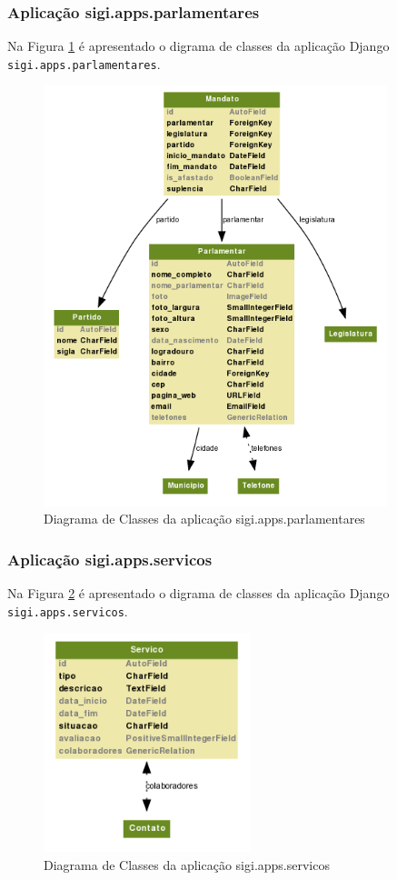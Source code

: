 \subsubsection{Aplicação sigi.apps.parlamentares}
Na Figura \ref{fig:parlamentares} é apresentado o digrama de classes da
aplicação Django \verb|sigi.apps.parlamentares|.

\begin{figure}[h]
  \centering
  \includegraphics[width=100mm]{../imagens/parlamentares.png}
  \caption{Diagrama de Classes da aplicação sigi.apps.parlamentares}
  \label{fig:parlamentares}
\end{figure}

\subsubsection{Aplicação sigi.apps.servicos}
Na Figura \ref{fig:servicos} é apresentado o digrama de classes da
aplicação Django \verb|sigi.apps.servicos|.

\begin{figure}[h]
  \centering
  \includegraphics[width=60mm]{../imagens/servicos.png}
  \caption{Diagrama de Classes da aplicação sigi.apps.servicos}
  \label{fig:servicos}
\end{figure}

%
%
